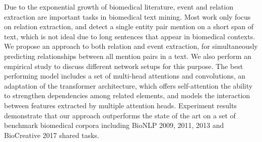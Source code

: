 Due to the exponential growth of biomedical literature, event and relation extraction are important tasks in biomedical text mining. Most work only focus on relation extraction, and detect a single entity pair mention on a short span of text, which is not ideal due to long sentences that appear in biomedical contexts. We propose an approach to both relation and event extraction, for simultaneously predicting relationships between all mention pairs in a text. We also perform an empirical study to discuss different network setups for this purpose. The best performing model includes a set of multi-head attentions and convolutions, an adaptation of the transformer architecture, which offers self-attention the ability to strengthen dependencies among related elements, and models the interaction between features extracted by multiple attention heads. Experiment results demonstrate that our approach outperforms the state of the art on a set of benchmark biomedical corpora including BioNLP 2009, 2011, 2013 and BioCreative 2017 shared tasks.
